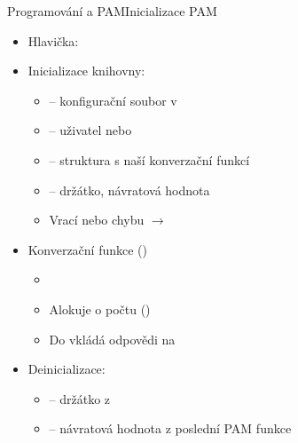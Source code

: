 \begin{frame}[fragile]{Programování a PAM}{Inicializace PAM}

  \begin{itemize}
    \item Hlavička: 

    \item Inicializace knihovny: 
    \begin{itemize}
      \item {} -- konfigurační soubor v 
      \item {} -- uživatel nebo 
      \item {} -- struktura s naší konverzační funkcí
      \item {} -- držátko, návratová hodnota

      \pause

      \item Vrací  nebo chybu $\rightarrow$
    \end{itemize}

    \pause

    \item Konverzační funkce ()
    \begin{itemize}
      \item {}
      \item Alokuje  o počtu  ()
      \item Do  vkládá odpovědi na 
    \end{itemize}

    \pause

    \item Deinicializace: 
    \begin{itemize}
      \item {} -- držátko z 
      \item {} -- návratová hodnota z poslední PAM funkce
    \end{itemize}

  \end{itemize}

\end{frame}

